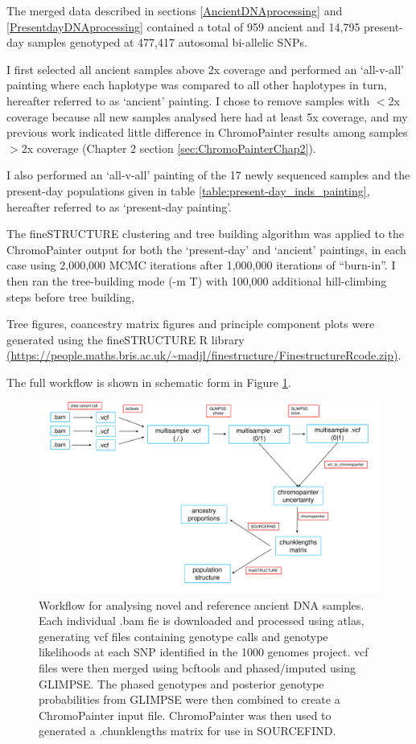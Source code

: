 The merged data described in sections \ref{AncientDNAprocessing} and \ref{PresentdayDNAprocessing} contained a total of 959 ancient and 14,795 present-day samples genotyped at 477,417 autosomal bi-allelic SNPs.

I first selected all ancient samples above 2x coverage and performed an `all-v-all' painting where each haplotype was compared to all other haplotypes in turn, hereafter referred to as `ancient' painting. I chose to remove samples with $<$2x coverage because all new samples analysed here had at least 5x coverage, and my previous work indicated little difference in ChromoPainter results among samples $>$2x coverage (Chapter 2 section \ref{sec:ChromoPainterChap2}). 

I also performed an `all-v-all' painting of the 17 newly sequenced samples and the present-day populations given in table \ref{table:present-day_inds_painting}, hereafter referred to as `present-day painting'.


The fineSTRUCTURE \cite{Lawson2012} clustering and tree building algorithm was applied to the ChromoPainter output for both the `present-day' and `ancient' paintings, in each case using 2,000,000 MCMC iterations after 1,000,000 iterations of ``burn-in''. I then ran the tree-building mode (-m T) with 100,000 additional hill-climbing steps before tree building,

Tree figures, coancestry matrix figures and principle component plots were generated using the fineSTRUCTURE R library \url{(https://people.maths.bris.ac.uk/~madjl/finestructure/FinestructureRcode.zip)}.

The full workflow is shown in schematic form in Figure \ref{fig:workflow_slav}.

\begin{figure}[htp]
    \centering
    \includegraphics[width=1.0\textwidth]{../images/chapter4/workflow.pdf}
    \caption{Workflow for analysing novel and reference ancient DNA samples. Each individual .bam fie is downloaded and processed using atlas, generating vcf files containing genotype calls and genotype likelihoods at each SNP identified in the 1000 genomes project. vcf files were then merged using bcftools and phased/imputed using GLIMPSE. The phased genotypes and posterior genotype probabilities from GLIMPSE were then combined to create a ChromoPainter input file. ChromoPainter was then used to generated a .chunklengths matrix for use in SOURCEFIND.}
    \label{fig:workflow_slav}
\end{figure}


